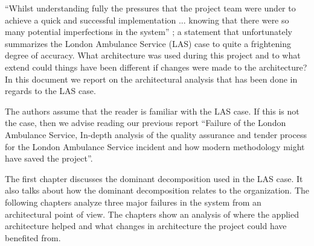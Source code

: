 ``Whilst understanding fully the pressures that the project team were under to achieve a quick and successful implementation ...
knowing that there were so many potential imperfections in the system” \autocite[4002]{officialreport};
a statement that unfortunately summarizes the London Ambulance Service (LAS) case to quite a frightening degree of accuracy.
What architecture was used during this project and to what extend could things have been different if changes were made to the architecture?
In this document we report on the architectural analysis that has been done in regards to the LAS case.

The authors assume that the reader is familiar with the LAS case.
If this is not the case, then we advise reading our previous report
``Failure of the London Ambulance Service, In-depth analysis of the quality assurance and tender process for the London Ambulance Service incident and how modern methodology might have saved the project''.

The first chapter discusses the dominant decomposition used in the LAS case.
It also talks about how the dominant decomposition relates to the organization.
The following chapters analyze three major failures in the system from an architectural point of view.
The chapters show an analysis of where the applied architecture helped and what changes in architecture the project could have benefited from.
